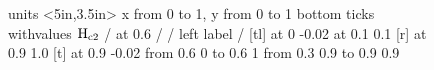\headheight 8pt



\pagestyle{empty}

\begin{figure}
\label{rbhct}
\beginpicture
\setcoordinatesystem units <5in,3.5in>
\setplotarea x from 0 to 1, y from 0 to 1
\axis bottom ticks withvalues $\rm H_{c2}$ / at 0.6 / /
\axis left label {} /
 [tl] at 0 -0.02
 at  0.1 0.1
 [r] at 0.9 1.0
 [t] at 0.9 -0.02
\linethickness=1pt
\setdashes
\putrule from 0.6 0 to 0.6 1
\putrule from 0.3 0.9 to 0.9 0.9
\setsolid
\endpicture
\caption[]{}
\end{figure}

